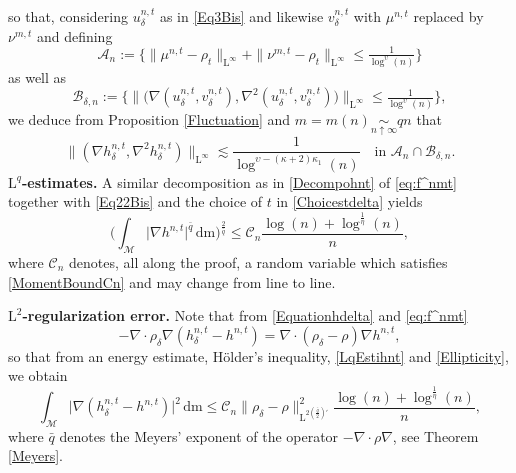 \documentclass[11pt,a4paper,oneside]{amsart}
\numberwithin{equation}{section}
\newcommand{\dd}{\mathrm{d}}
\newcommand{\LL}{\mathrm{L}}
\newcommand{\m}{\mathrm{m}}
\begin{document}
%
so that, considering $u^{n,t}_\delta$ as in \eqref{Eq3Bis} and likewise $v^{n,t}_\delta$ with $\mu^{n,t}$ replaced by $\nu^{m,t}$ and defining 
%
\begin{equation}\label{eq:An}
%
\mathcal{A}_n:=\Big\{\|\mu^{n,t}-\rho_t\|_{\LL^{\infty}}+\|\nu^{m,t}-\rho_t\|_{\LL^{\infty}}\leq \tfrac{1}{\log^{\upsilon}(n)}\Big\}
\end{equation}
as well as
\begin{equation}\label{eq:Bdeltan}
\mathcal{B}_{\delta,n}:=\Big\{\big\|\big(\nabla (u^{n,t}_\delta, v^{n,t}_\delta),\nabla^2 (u^{n,t}_\delta, v^{n,t}_\delta)\big)\big\|_{\LL^\infty}\leq \tfrac{1}{\log^{\upsilon}(n)}\Big\},
%
\end{equation}
%
we deduce from Proposition \ref{Fluctuation} and $m=m(n)\underset{n\uparrow\infty}{\sim} qn$ that
%
\begin{equation}\label{Boundhnt}
%
\big\|(\nabla h^{n,t}_\delta,\nabla^2 h^{n,t}_\delta)\big\|_{\LL^{\infty}}\lesssim \frac{1}{\log^{\upsilon-(\kappa+2)\kappa_1}(n)}\quad\text{in $\mathcal{A}_n\cap \mathcal{B}_{\delta,n}$.}
%
\end{equation}
%
\textbf{$\LL^q$-estimates. }A similar decomposition as in \eqref{Decompohnt} of \eqref{eq:f^nmt} together with \eqref{Eq22Bis} and the choice of $t$ in \eqref{Choicestdelta} yields
%
\begin{equation}\label{LqEstihnt}
%
\Big(\int_{\mathcal{M}}\vert \nabla h^{n,t}\vert^{\bar{q}}\,\dd\m\Big)^{\frac{2}{\bar{q}}}\leq \mathcal{C}_n\frac{\log(n)+\log^{\frac{1}{\eta}}(n)}{n},
%
\end{equation}
%
where $\mathcal{C}_n$ denotes, all along the proof, a random variable which satisfies \eqref{MomentBoundCn} and may change from line to line. 

%
\medskip
%

\textbf{$\LL^2$-regularization error. }Note that from \eqref{Equationhdelta} and \eqref{eq:f^nmt}
%
\begin{equation}\label{DecompositionDeltaProof}
%
-\nabla\cdot\rho_\delta\nabla(h^{n,t}_\delta-h^{n,t})=\nabla\cdot (\rho_\delta-\rho)\nabla h^{n,t},
%
\end{equation}
%
so that from an energy estimate, Hölder's inequality, \eqref{LqEstihnt} and \eqref{Ellipticity}, we obtain 
%
\begin{equation}\label{ErrorApproxL2}
%
\int_{\mathcal{M}}\vert\nabla (h^{n,t}_\delta-h^{n,t})\vert^2\,\dd\m\leq \mathcal{C}_n\|\rho_{\delta}-\rho\|^2_{\LL^{2(\frac{\bar{q}}{2})'}}\frac{\log(n)+\log^{\frac{1}{\eta}}(n)}{n},
%
\end{equation}
%
where $\bar{q}$ denotes the Meyers' exponent of the operator $-\nabla\cdot \rho\nabla$, see Theorem \ref{Meyers}.
\end{document}
